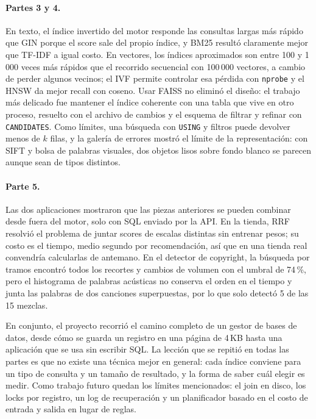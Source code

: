 \documentclass[11pt,a4paper]{article}
\begin{document}
\paragraph{Partes 3 y 4.} En texto, el índice invertido del motor responde las consultas largas más rápido que GIN porque el score sale del propio índice, y BM25 resultó claramente mejor que TF-IDF a igual costo. En vectores, los índices aproximados son entre 100 y 1\,000 veces más rápidos que el recorrido secuencial con 100\,000 vectores, a cambio de perder algunos vecinos; el IVF permite controlar esa pérdida con \texttt{nprobe} y el HNSW da mejor recall con coseno. Usar FAISS no eliminó el diseño: el trabajo más delicado fue mantener el índice coherente con una tabla que vive en otro proceso, resuelto con el archivo de cambios y el esquema de filtrar y refinar con \texttt{CANDIDATES}. Como límites, una búsqueda con \texttt{USING} y filtros puede devolver menos de $k$ filas, y la galería de errores mostró el límite de la representación: con SIFT y bolsa de palabras visuales, dos objetos lisos sobre fondo blanco se parecen aunque sean de tipos distintos.

\paragraph{Parte 5.} Las dos aplicaciones mostraron que las piezas anteriores se pueden combinar desde fuera del motor, solo con SQL enviado por la API. En la tienda, RRF resolvió el problema de juntar scores de escalas distintas sin entrenar pesos; su costo es el tiempo, medio segundo por recomendación, así que en una tienda real convendría calcularlas de antemano. En el detector de copyright, la búsqueda por tramos encontró todos los recortes y cambios de volumen con el umbral de 74\,\%, pero el histograma de palabras acústicas no conserva el orden en el tiempo y junta las palabras de dos canciones superpuestas, por lo que solo detectó 5 de las 15 mezclas.

En conjunto, el proyecto recorrió el camino completo de un gestor de bases de datos, desde cómo se guarda un registro en una página de 4\,KB hasta una aplicación que se usa sin escribir SQL. La lección que se repitió en todas las partes es que no existe una técnica mejor en general: cada índice conviene para un tipo de consulta y un tamaño de resultado, y la forma de saber cuál elegir es medir. Como trabajo futuro quedan los límites mencionados: el join en disco, los locks por registro, un log de recuperación y un planificador basado en el costo de entrada y salida en lugar de reglas.
\end{document}
